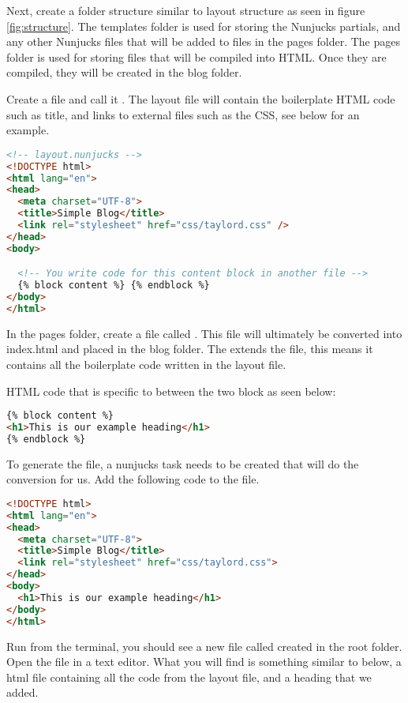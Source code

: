 Next, create a folder structure similar to layout structure as seen in figure \ref{fig:structure}. The templates folder is used for storing the Nunjucks partials, and any other Nunjucks files that will be added to files in the pages folder. The pages folder is used for storing files that will be compiled into HTML. Once they are compiled, they will be created in the blog folder.

Create a file and call it . The layout file will contain the boilerplate HTML code such as title, and links to external files such as the CSS, see below for an example.

\begin{lstlisting}[language=HTML]
<!-- layout.nunjucks -->
<!DOCTYPE html>
<html lang="en">
<head>
  <meta charset="UTF-8">
  <title>Simple Blog</title>
  <link rel="stylesheet" href="css/taylord.css" />
</head>
<body>

  <!-- You write code for this content block in another file -->
  {% block content %} {% endblock %}
</body>
</html>
\end{lstlisting}

In the pages folder, create a file called . This file will ultimately be converted into index.html and placed in the blog folder. The  extends the  file, this means it contains all the boilerplate code written in the layout file. 

HTML code that is specific to  between the two block as seen below: 

\begin{lstlisting}[language=HTML]
{% block content %}
<h1>This is our example heading</h1>
{% endblock %}
\end{lstlisting}

To generate the  file, a nunjucks task needs to be created that will do the conversion for us. Add the following code to the  file.  

\begin{lstlisting}[language=HTML]
<!DOCTYPE html>
<html lang="en">
<head>
  <meta charset="UTF-8">
  <title>Simple Blog</title>
  <link rel="stylesheet" href="css/taylord.css">
</head>
<body>
  <h1>This is our example heading</h1>
</body>
</html>
\end{lstlisting}

Run  from the terminal, you should see a new file called  created in the root folder. Open the file in a text editor. What you will find is something similar to below, a html file containing all the code from the layout file, and a heading that we added. 


